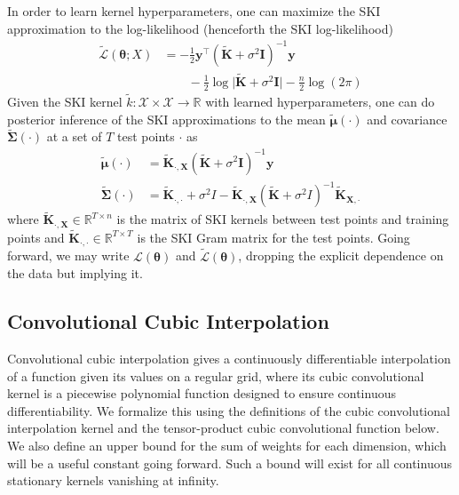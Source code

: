 In order to learn kernel hyperparameters, one can maximize the SKI approximation to the log-likelihood (henceforth the SKI log-likelihood)
\begin{align*}
    \tilde{\mathcal{L}}(\boldsymbol{\theta};X)
&=-\frac{1}{2}\textbf{y}^\top (\tilde{\textbf{K}}+\sigma^2 \textbf{I})^{-1}\textbf{y}\\
&\qquad-\frac{1}{2}\log \vert \tilde{\textbf{K}}+\sigma^2 \textbf{I}\vert -\frac{n}{2}\log (2\pi)
\end{align*}
Given the SKI kernel $\tilde{k}:\mathcal{X}\times \mathcal{X}\rightarrow \mathbb{R}$ with learned hyperparameters, one can do posterior inference of the SKI approximations to the mean $\tilde{\boldsymbol{\mu}}(\cdot)$ and covariance $\tilde{\boldsymbol{\Sigma}}(\cdot)$ at a set of $T$ test points $\cdot$ as
\begin{align*}
    \tilde{\boldsymbol{\mu}}(\cdot)&=\tilde{\mathbf{K}}_{\cdot, \mathbf{X}}\left(\tilde{\mathbf{K}}+\sigma^{2} \mathbf{I}\right)^{-1} \mathbf{y}\\
    \tilde{\boldsymbol{\Sigma}}(\cdot)&=\tilde{\textbf{K}}_{\cdot,\cdot}+\sigma^2I-\tilde{\textbf{K}}_{\cdot,\textbf{X}} (\tilde{\textbf{K}}+\sigma^2 I)^{-1}\tilde{\textbf{K}}_{\textbf{X},\cdot}
\end{align*}
where $\tilde{\textbf{K}}_{\cdot,\textbf{X}}\in \mathbb{R}^{T\times n}$ is the matrix of SKI kernels between test points and training points and $\tilde{\textbf{K}}_{\cdot,\cdot}\in \mathbb{R}^{T\times T}$ is the SKI Gram matrix for the test points. Going forward, we may write $\mathcal{L}(\boldsymbol{\theta})$ and $\tilde{\mathcal{L}}(\boldsymbol{\theta})$, dropping the explicit dependence on the data but implying it.


\subsection{Convolutional Cubic Interpolation}\label{subsec:convolutional-cubic-interpolation}

Convolutional cubic interpolation \citep{keys1981cubic} gives a continuously differentiable interpolation of a function given its values on a regular grid, where its cubic convolutional kernel is a piecewise polynomial function designed to ensure continuous differentiability. We formalize this using the definitions of the cubic convolutional interpolation kernel and the tensor-product cubic convolutional function below. We also define an upper bound for the sum of weights for each dimension, which will be a useful constant going forward. Such a bound will exist for all continuous stationary kernels vanishing at infinity.

